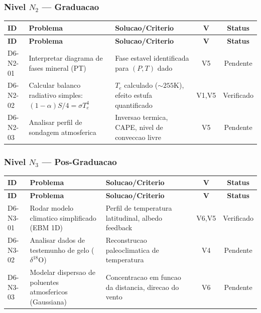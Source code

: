 \subsubsection{Nivel $N_2$ --- Graduacao}

\begin{longtable}{|p{2.0cm}|p{4.2cm}|p{4.2cm}|c|c|}
\hline
\textbf{ID} & \textbf{Problema} & \textbf{Solucao/Criterio} & \textbf{V} & \textbf{Status} \\
\hline
\endfirsthead
\hline
\textbf{ID} & \textbf{Problema} & \textbf{Solucao/Criterio} & \textbf{V} & \textbf{Status} \\
\hline
\endhead
\hline
\endfoot
D6-N2-01 & Interpretar diagrama de fases mineral (PT) & Fase estavel identificada para $(P,T)$ dado & V5 & Pendente \\
\hline
D6-N2-02 & Calcular balanco radiativo simples: $(1-\alpha)S/4=\sigma T_{e}^{4}$ & $T_{e}$ calculado ($\sim 255$K), efeito estufa quantificado & V1,V5 & Verificado \\
\hline
D6-N2-03 & Analisar perfil de sondagem atmosferica & Inversao termica, CAPE, nivel de conveccao livre & V5 & Pendente \\
\hline
\end{longtable}

\subsubsection{Nivel $N_3$ --- Pos-Graduacao}

\begin{longtable}{|p{2.0cm}|p{4.2cm}|p{4.2cm}|c|c|}
\hline
\textbf{ID} & \textbf{Problema} & \textbf{Solucao/Criterio} & \textbf{V} & \textbf{Status} \\
\hline
\endfirsthead
\hline
\textbf{ID} & \textbf{Problema} & \textbf{Solucao/Criterio} & \textbf{V} & \textbf{Status} \\
\hline
\endhead
\hline
\endfoot
D6-N3-01 & Rodar modelo climatico simplificado (EBM 1D) & Perfil de temperatura latitudinal, albedo feedback & V6,V5 & Verificado \\
\hline
D6-N3-02 & Analisar dados de testemunho de gelo ($\delta^{18}\text{O}$) & Reconstrucao paleoclimatica de temperatura & V4 & Pendente \\
\hline
D6-N3-03 & Modelar dispersao de poluentes atmosfericos (Gaussiana) & Concentracao em funcao da distancia, direcao do vento & V6 & Pendente \\
\hline
\end{longtable}

